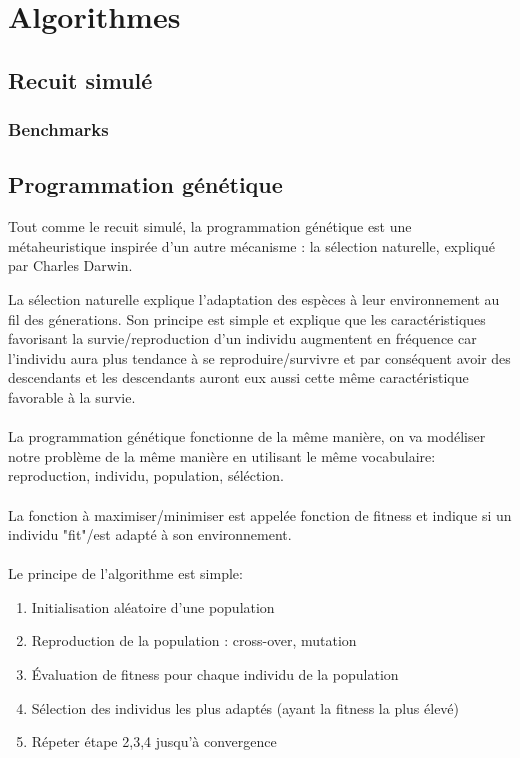\documentclass{report}
\begin{document}
\chapter{Algorithmes}

\section{Recuit simulé}
\subsection{Benchmarks}

\section{Programmation génétique}

Tout comme le recuit simulé, la programmation génétique est une
métaheuristique inspirée d'un autre mécanisme : la sélection
naturelle, expliqué par Charles Darwin.

La sélection naturelle explique l'adaptation des espèces à leur
environnement au fil des génerations. Son principe est simple et
explique que les caractéristiques favorisant la survie/reproduction
d'un individu augmentent en fréquence car l'individu aura plus
tendance à se reproduire/survivre et par conséquent avoir des
descendants et les descendants auront eux aussi cette même
caractéristique favorable à la survie.\\\\

La programmation génétique fonctionne de la même manière, on va
modéliser notre problème de la même manière en utilisant le même
vocabulaire: reproduction, individu, population, séléction.\\\\

La fonction à maximiser/minimiser est appelée fonction de fitness et
indique si un individu "fit"/est adapté à son environnement.\\\\

Le principe de l'algorithme est simple:
\begin{enumerate}
\item Initialisation aléatoire d'une population
\item Reproduction de la population : cross-over, mutation
\item \'Evaluation de fitness pour chaque individu de la population
\item Sélection des individus les plus adaptés (ayant la fitness la plus élevé)
\item Répeter étape 2,3,4 jusqu'à convergence
\end{enumerate}
\end{document}
